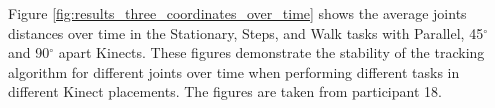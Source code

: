 Figure \ref{fig:results_three_coordinates_over_time} shows the average joints distances over time in the Stationary, Steps, and Walk tasks with Parallel, 45$^{\circ}$ and 90$^{\circ}$ apart Kinects. These figures demonstrate the stability of the tracking algorithm for different joints over time when performing different tasks in different Kinect placements. The figures are taken from participant 18.

\begin{figure}[!h]
  \centering

   \\
\end{figure}
